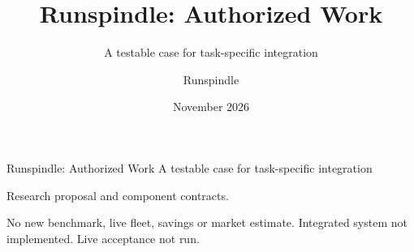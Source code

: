 \documentclass[aspectratio=169,11pt]{beamer}
\title{Runspindle: Authorized Work}
\subtitle{A testable case for task-specific integration}
\author{Runspindle}\date{November 2026}
\begin{document}
\begin{frame}[label=opening]{Runspindle: Authorized Work}
{\Large A testable case for task-specific integration}
\medskip\par Research proposal and component contracts.
\medskip\par No new benchmark, live fleet, savings or market estimate.
\vfill {\footnotesize Integrated system not implemented. Live acceptance not run.}
\end{frame}










\end{document}
